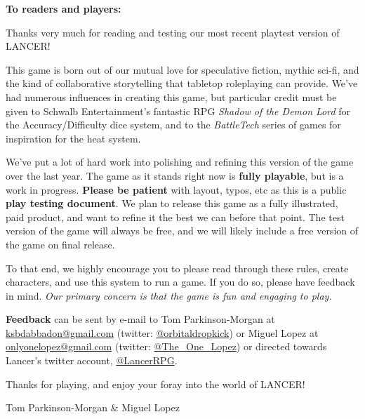\textbf{To readers and players:}

Thanks very much for reading and testing our most recent playtest version of LANCER!

This game is born out of our mutual love for speculative fiction, mythic sci-fi, and the kind of
collaborative storytelling that tabletop roleplaying can provide. We’ve had numerous influences in
creating this game, but particular credit must be given to Schwalb Entertainment’s fantastic RPG
\textit{Shadow of the Demon Lord} for the Accuracy/Difficulty dice system, and to the \textit{BattleTech} series of
games for inspiration for the heat system.

We’ve put a lot of hard work into polishing and refining this version of the game over the last year.
The game as it stands right now is \textbf{fully playable}, but is a work in progress. \textbf{Please be patient}
with layout, typos, etc as this is a public \textbf{play testing document}. We plan to release this game as
a fully illustrated, paid product, and want to refine it the best we can before that point. The test
version of the game will always be free, and we will likely include a free version of the game on
final release.

To that end, we highly encourage you to please read through these rules, create characters, and
use this system to run a game. If you do so, please have feedback in mind. \textit{Our primary concern
is that the game is fun and engaging to play.}

\textbf{Feedback} can be sent by e-mail to Tom Parkinson-Morgan at \href{mailto:ksbdabbadon@gmail.com}{ksbdabbadon@gmail.com} (twitter:
\href{https://twitter.com/Orbitaldropkick}{@orbitaldropkick}) or Miguel Lopez at \href{mailto:onlyonelopez@gmail.com}{onlyonelopez@gmail.com} (twitter: \href{https://twitter.com/The_One_Lopez}{@The\_One\_Lopez}) or
directed towards Lancer’s twitter account, \href{https://twitter.com/Lancer_RPG}{@LancerRPG}.

Thanks for playing, and enjoy your foray into the world of LANCER!

\quad Tom Parkinson-Morgan \& Miguel Lopez